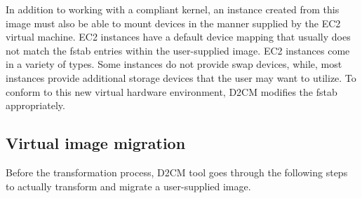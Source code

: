 \documentclass[a4paper,10pt]{article}
\begin{document}
In addition to working with a compliant kernel, an instance created from this image must also be able to mount devices in the manner supplied by the EC2 virtual machine. EC2 instances have a default device mapping that usually does not match the fstab entries within the user-supplied image. EC2 instances come in a variety of types. Some instances do not provide swap devices, while, most instances provide additional storage devices that the user may want to utilize. To conform to this new virtual hardware environment, D2CM modifies the fstab appropriately. 

\subsection{Virtual image migration}

Before the transformation process, D2CM tool goes through the following steps to actually transform and migrate a user-supplied image. 
\end{document}
